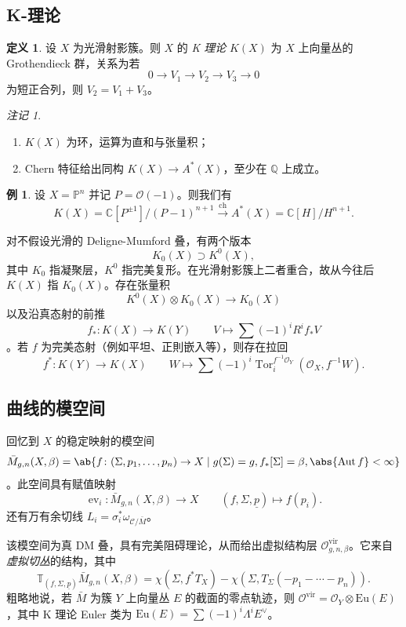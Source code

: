 \documentclass{amsart}
\theoremstyle{definition}
\newtheorem{defn}[thm]{定义}
\newtheorem{exm}[thm]{例}
\theoremstyle{remark}
\newtheorem{rmk}[thm]{注记}
\theoremstyle{plain}
\theoremstyle{definition}
\theoremstyle{remark}
\newcommand{\C}{\mathbb{C}}
\newcommand{\Q}{\mathbb{Q}}
\renewcommand{\P}{\mathbb{P}}
\newcommand{\mc}[1]{\mathcal{#1}}
\newcommand{\mr}[1]{\mathrm{#1}}
\newcommand{\on}[1]{\operatorname{#1}}
\newcommand{\ul}[1]{\underline{#1}}
\newcommand{\1}{\mathbf{1}}
\newcommand{\2}{\mathbf{2}}
\newcommand{\3}{\mathbf{3}}
\newcommand{\vir}{\mr{vir}}
\DeclareMathOperator{\Aut}{Aut}
\DeclareMathOperator{\ev}{ev}
\begin{document}
\subsection{K-理论}%
\label{sub:K-theory}

\begin{defn}
    设 \(X\) 为光滑射影簇。则 \(X\) 的 \textit{K 理论} \(K(X)\) 为 \(X\) 上向量丛的 Grothendieck 群，关系为若
    \[ 0 \to V_1 \to V_2 \to V_3 \to 0 \]
    为短正合列，则 \(V_2 = V_1 + V_3\)。
\end{defn}

\begin{rmk}\leavevmode
    \begin{enumerate}
        \item \(K(X)\) 为环，运算为直和与张量积；
        \item Chern 特征给出同构 \(K(X) \to A^*(X)\)，至少在 \(\Q\) 上成立。
    \end{enumerate}
\end{rmk}

\begin{exm}
    设 \(X = \P^n\) 并记 \(P = \mc{O}(-1)\)。则我们有
    \[ K(X) = \C[P^{\pm 1}]/(P-1)^{n+1} \xrightarrow{\on{ch}} A^*(X) = \C[H]/H^{n+1}. \]
\end{exm}

对不假设光滑的 Deligne-Mumford 叠，有两个版本
\[ K_0(X) \supset K^0(X), \]
其中 \(K_0\) 指凝聚层，\(K^0\) 指完美复形。在光滑射影簇上二者重合，故从今往后 \(K(X)\) 指 \(K_0(X)\)。存在张量积
\[ K^0(X) \otimes K_0(X) \to K_0(X) \]
以及沿真态射的前推
\[ f_* \colon K(X) \to K(Y) \qquad V \mapsto \sum (-1)^i R^i f_* V \]
。若 \(f\) 为完美态射（例如平坦、正則嵌入等），则存在拉回
\[ f^* \colon K(Y) \to K(X) \qquad W \mapsto \sum (-1)^i \on{Tor}_i^{f^{-1} \mc{O}_Y} (\mc{O}_X, f^{-1} W). \]

\subsection{曲线的模空间}%
\label{sub:Moduli of curves}

回忆到 \(X\) 的稳定映射的模空间
\[ \bar{M}_{g,n}(X, \beta) = \ab\{ f \colon (\Sigma, p_1, \ldots, p_n) \to X \mid g(\Sigma) = g, f_*[\Sigma] = \beta, \abs{\Aut f} < \infty \} \]
。此空间具有赋值映射
\[ \ev_i \colon \bar{M}_{g,n}(X, \beta) \to X \qquad (f, \Sigma, \ul{p}) \mapsto f(p_i). \]
还有万有余切线 \(L_i = \sigma_i^* \omega_{ \mc{C}/\bar{M} }\)。

该模空间为真 DM 叠，具有完美阻碍理论，从而给出虚拟结构层 \(\mc{O}^{\vir}_{g,n,\beta}\)。它来自\textit{虚拟切丛}的结构，其中
\[ \mathbb{T}_{(f, \Sigma, \ul{p})} \bar{M}_{g,n}(X, \beta) = \chi(\Sigma, f^* T_X) - \chi(\Sigma, T_{\Sigma}(-p_1 - \cdots - p_n)). \]
粗略地说，若 \(\bar{M}\) 为簇 \(Y\) 上向量丛 \(E\) 的截面的零点轨迹，则 \(\mc{O}^{\vir} = \mc{O}_Y \otimes \mr{Eu}(E)\)，其中 K 理论 Euler 类为 \(\mr{Eu}(E) = \sum (-1)^i \Lambda^i E^{\vee}\)。
\end{document}
